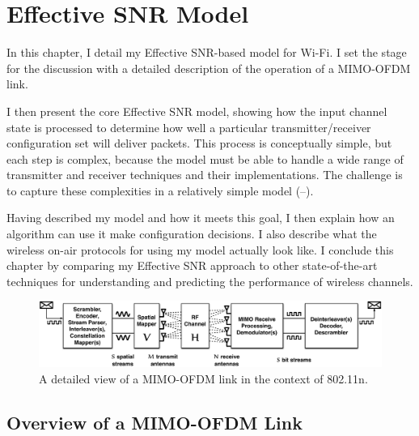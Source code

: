 \ifx\mainfile\undefined

\setcounter{chapter}{3} %
\fi

\cleardoublepage
\chapter{Effective SNR Model}
\label{chap:model}

In this chapter, I detail my Effective SNR-based model for Wi-Fi. I set the stage for the discussion with a detailed description of the operation of a MIMO-OFDM link.

I then present the core Effective SNR model, showing how the input channel state is processed to determine how well a particular transmitter/receiver configuration set will deliver packets. %
This process is conceptually simple, but each step is complex, because the model must be able to handle a wide range of transmitter and receiver techniques and their implementations. The challenge is to capture these complexities in a relatively simple model (--).

Having described my model and how it meets this goal, I then explain how an algorithm can use it make configuration decisions. I also describe what the wireless on-air protocols for using my model actually look like. I conclude this chapter by comparing my Effective SNR approach to other state-of-the-art techniques for understanding and predicting the performance of wireless channels.

\begin{figure}[b]
\centering
\includegraphics[width=\textwidth]{figures/model/11n_link_simplified_bigger_fonts.pdf}
\caption[An 802.11n link]{\label{fig:11n_link_simplified}A detailed view of a MIMO-OFDM link in the context of 802.11n.}
\end{figure}

\section{Overview of a MIMO-OFDM Link}
\label{sec:11n_overview}

